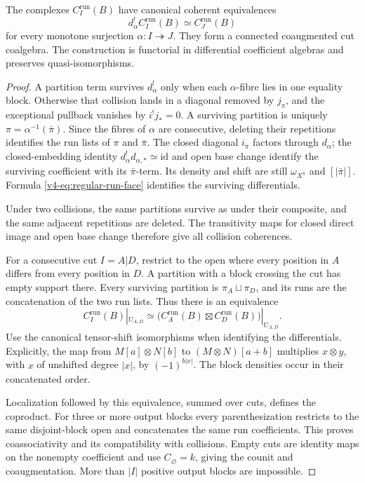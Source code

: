 \begin{theorem}\label{v4-thm:regular-word-realization}
The complexes \(C_I^{\mathrm{run}}(B)\) have canonical
coherent equivalences
\[
 d_\alpha^!C_I^{\mathrm{run}}(B)
       \simeq C_J^{\mathrm{run}}(B)
\]
for every monotone surjection \(\alpha:I\twoheadrightarrow J\).
They form a connected coaugmented cut coalgebra. The
construction is functorial in differential coefficient algebras
and preserves quasi-isomorphisms.
\end{theorem}

\begin{proof}
A partition term survives \(d_\alpha^!\) only when each
\(\alpha\)-fibre lies in one equality block. Otherwise that
collision lands in a diagonal removed by \(j_\pi\), and
the exceptional pullback vanishes by \(i^!j_*=0\).
A surviving partition is uniquely
\(\pi=\alpha^{-1}(\bar\pi)\). Since the fibres of \(\alpha\)
are consecutive, deleting their repetitions identifies
the run lists of \(\pi\) and \(\bar\pi\).
The closed diagonal \(i_\pi\) factors through \(d_\alpha\);
the closed-embedding identity \(d_\alpha^!d_{\alpha,*}
\simeq\mathrm{id}\) and open base change identify the
surviving coefficient with its \(\bar\pi\)-term. Its
density and shift are still \(\omega_{X^{\bar\pi}}\)
and \([|\bar\pi|]\). Formula
\eqref{v4-eq:regular-run-face} identifies the surviving
differentials.

Under two collisions, the same partitions survive as
under their composite, and the same adjacent repetitions
are deleted. The transitivity maps for closed direct
image and open base change therefore give all collision
coherences.

For a consecutive cut \(I=A|D\), restrict to the open
where every position in \(A\) differs from every position
in \(D\). A partition with a block crossing the cut has
empty support there. Every surviving partition is
\(\pi_A\sqcup\pi_D\), and its runs are the concatenation
of the two run lists. Thus there is an equivalence
\[
 C_I^{\mathrm{run}}(B)|_{U_{A,D}}
   \simeq
 \bigl(C_A^{\mathrm{run}}(B)\boxtimes
       C_D^{\mathrm{run}}(B)\bigr)|_{U_{A,D}}.
\]
Use the canonical tensor-shift isomorphisms when
identifying the differentials. Explicitly, the map
from \(M[a]\otimes N[b]\) to \((M\otimes N)[a+b]\)
multiplies \(x\otimes y\), with \(x\) of unshifted
degree \(|x|\), by \((-1)^{b|x|}\).
The block densities occur in their concatenated order.

Localization followed by this equivalence, summed over
cuts, defines the coproduct. For three or more output
blocks every parenthesization restricts to the same
disjoint-block open and concatenates the same run
coefficients. This proves coassociativity and its
compatibility with collisions. Empty cuts are identity
maps on the nonempty coefficient and use
\(C_\varnothing=k\), giving the counit and coaugmentation.
More than \(|I|\) positive output blocks are impossible.


\end{proof}
